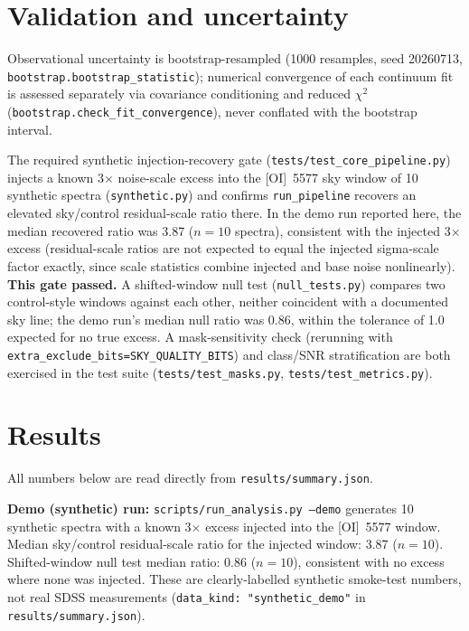 \documentclass[11pt]{article}
\begin{document}
\section{Validation and uncertainty}
\label{sec:validation}
Observational uncertainty is bootstrap-resampled (1000 resamples, seed
20260713, \texttt{bootstrap.bootstrap\_statistic}); numerical convergence of
each continuum fit is assessed separately via covariance conditioning and
reduced $\chi^2$ (\texttt{bootstrap.check\_fit\_convergence}), never
conflated with the bootstrap interval.

The required synthetic injection-recovery gate
(\texttt{tests/test\_core\_pipeline.py}) injects a known 3$\times$ noise-scale
excess into the [OI]~5577 sky window of 10 synthetic spectra
(\texttt{synthetic.py}) and confirms \texttt{run\_pipeline} recovers an
elevated sky/control residual-scale ratio there. In the demo run reported
here, the median recovered ratio was 3.87 ($n=10$ spectra), consistent with
the injected 3$\times$ excess (residual-scale ratios are not expected to
equal the injected sigma-scale factor exactly, since scale statistics
combine injected and base noise nonlinearly). \textbf{This gate passed.} A
shifted-window null test (\texttt{null\_tests.py}) compares two
control-style windows against each other, neither coincident with a
documented sky line; the demo run's median null ratio was 0.86, within the
tolerance of 1.0 expected for no true excess. A mask-sensitivity check
(rerunning with \texttt{extra\_exclude\_bits=SKY\_QUALITY\_BITS}) and
class/SNR stratification are both exercised in the test suite
(\texttt{tests/test\_masks.py}, \texttt{tests/test\_metrics.py}).

\section{Results}
\label{sec:results}
All numbers below are read directly from \texttt{results/summary.json}.

\textbf{Demo (synthetic) run:} \texttt{scripts/run\_analysis.py --demo}
generates 10 synthetic spectra with a known 3$\times$ excess injected into
the [OI]~5577 window. Median sky/control residual-scale ratio for the
injected window: 3.87 ($n=10$). Shifted-window null test median ratio:
0.86 ($n=10$), consistent with no excess where none was injected. These are
clearly-labelled synthetic smoke-test numbers, not real SDSS measurements
(\texttt{data\_kind: "synthetic\_demo"} in \texttt{results/summary.json}).
\end{document}
